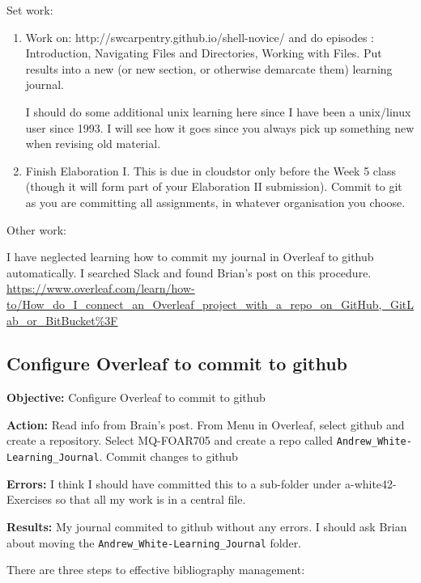 \documentclass[a4paper,12pt]{article}
\begin{document}
Set work:
\begin{enumerate}
    \item Work on: http://swcarpentry.github.io/shell-novice/ and do episodes : Introduction, Navigating Files and Directories, Working with Files. Put results into a new (or new section, or otherwise demarcate them) learning journal.
    
    I should do some additional unix learning here since I have been a unix/linux user since 1993. I will see how it goes since you always pick up something new when revising old material. 
    
    \item Finish Elaboration I. This is due in cloudstor only before the Week 5 class (though it will form part of your Elaboration II submission). Commit to git as you are committing all assignments, in whatever organisation you choose. 

\end{enumerate}

Other work:

I have neglected learning how to commit my journal in Overleaf to github automatically. I searched Slack and found Brian's post on this procedure.\\

\url{https://www.overleaf.com/learn/how-to/How_do_I_connect_an_Overleaf_project_with_a_repo_on_GitHub,_GitLab_or_BitBucket%3F}\\

\subsection{Configure Overleaf to commit to github}

\textbf{Objective:} Configure Overleaf to commit to github

\textbf{Action:} Read info from Brain's post. From Menu in Overleaf, select github and create a repository. Select MQ-FOAR705 and create a repo called \verb|Andrew_White-Learning_Journal|. Commit changes to github

\textbf{Errors:} I think I should have committed this to a sub-folder under a-white42-Exercises so that all my work is in a central file. 

\textbf{Results:} My journal commited to github without any errors. I should ask Brian about moving the \verb|Andrew_White-Learning_Journal| folder.



There are three steps to effective bibliography management:
\end{document}
